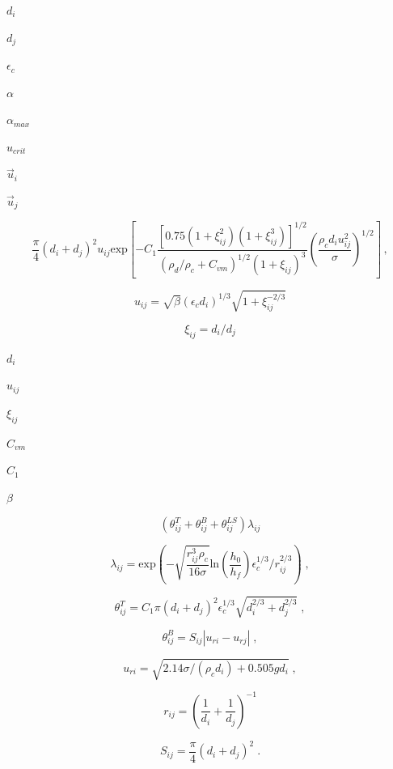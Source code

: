 \documentclass{article}
\begin{document}
$        d_i           $
\pagebreak

$        d_j           $
\pagebreak

$        \epsilon_c    $
\pagebreak

$        \alpha        $
\pagebreak

$        \alpha_{max}  $
\pagebreak

$        u_{crit}      $
\pagebreak

$        \vec{u}_i     $
\pagebreak

$        \vec{u}_j     $
\pagebreak

\[
    \frac{\pi}{4} (d_i + d_j)^2 u_{ij}
    \mathrm{exp}
    \left[
      - C_1
        \frac
        {[0.75(1 + \xi_{ij}^2)(1 + \xi_{ij}^3)]^{1/2}}
        {(\rho_d/\rho_c + C_{vm})^{1/2} (1 + \xi_{ij})^3}
        \left(\frac{\rho_c d_i u_{ij}^2}{\sigma}\right)^{1/2}
    \right]\,,
\]
\pagebreak

\[
    u_{ij} = \sqrt{\beta} (\epsilon_c d_i)^{1/3} \sqrt{1 + \xi_{ij}^{-2/3}}
\]
\pagebreak

\[
    \xi_{ij} = d_i/d_j
\]
\pagebreak

$        d_i         $
\pagebreak

$        u_{ij}      $
\pagebreak

$        \xi_{ij}    $
\pagebreak

$        C_{vm}      $
\pagebreak

$        C_1         $
\pagebreak

$        \beta       $
\pagebreak

\[
    \left( \theta_{ij}^{T} + \theta_{ij}^{B} + \theta_{ij}^{LS} \right)
    \lambda_{ij}
\]
\pagebreak

\[
    \lambda_{ij} =
        \mathrm{exp}
        \left(
          - \sqrt{\frac{r_{ij}^3 \rho_c}{16 \sigma}}
            \mathrm{ln} \left(\frac{h_0}{h_f}\right)
            \epsilon_c^{1/3}/r_{ij}^{2/3}
        \right)\;,
\]
\pagebreak

\[
    \theta_{ij}^{T} =
        C_1 \pi (d_i + d_j)^{2} \epsilon_c^{1/3}
        \sqrt{d_{i}^{2/3} + d_{j}^{2/3}}\;,
\]
\pagebreak

\[
    \theta_{ij}^{B} = S_{ij} \left| u_{ri} - u_{rj} \right|\;,
\]
\pagebreak

\[
    u_{ri} = \sqrt{2.14 \sigma / \left(\rho_c d_i \right) + 0.505 g d_i}\;,
\]
\pagebreak

\[
    r_{ij} = \left( \frac{1}{d_i} + \frac{1}{d_j} \right)^{-1}
\]
\pagebreak

\[
    S_{ij} = \frac{\pi}{4} \left(d_i + d_j\right)^{2}\;.
\]
\pagebreak
\end{document}
